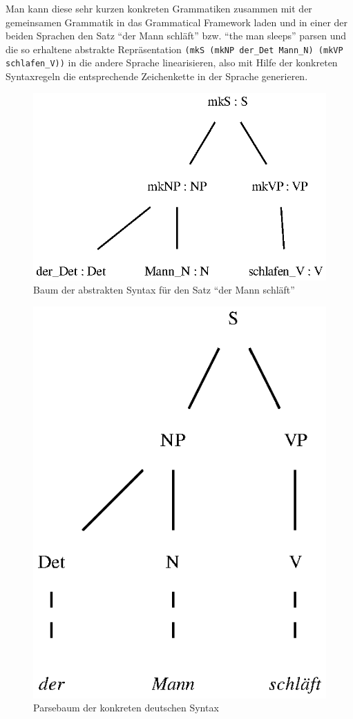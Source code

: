 Man kann diese sehr kurzen konkreten Grammatiken zusammen mit der gemeinsamen Grammatik in das Grammatical Framework laden und in einer der beiden Sprachen den Satz "`der Mann schläft"' bzw. "`the man sleeps"' parsen und die so erhaltene abstrakte Repräsentation \texttt{(mkS (mkNP der\_Det Mann\_N) (mkVP schlafen\_V))} in die andere Sprache linearisieren, also mit Hilfe der konkreten Syntaxregeln die entsprechende Zeichenkette in der Sprache generieren. \par
\begin{figure}
\includegraphics{graphics/MiniSatzTree.eps}
\caption{Baum der abstrakten Syntax für den Satz "`der Mann schläft"'}\label{MiniSatz-AbsTree}
\end{figure}
\begin{figure}
\includegraphics{graphics/MiniSatzParseGer.eps}
\caption{Parsebaum der konkreten deutschen Syntax}\label{MiniSatz-ParseGer}
\end{figure}
